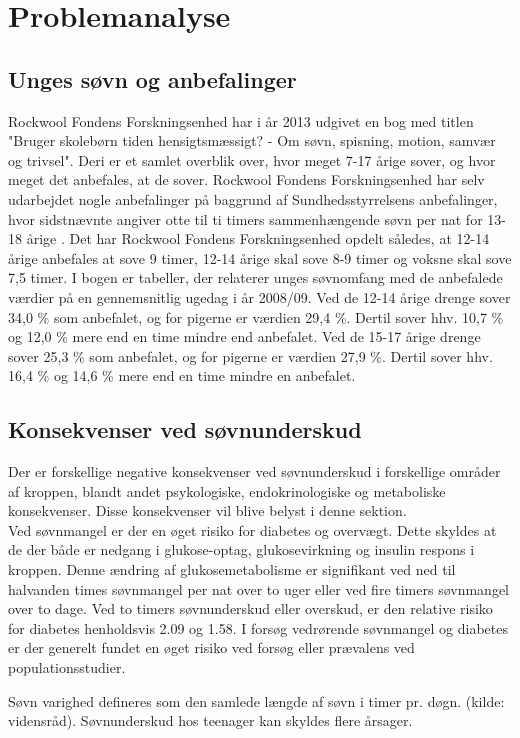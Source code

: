 \chapter{Problemanalyse}
\label{cha:Problemanalyse}


\section{Unges søvn og anbefalinger}
\label{sec:UngesSoevnOgAnbefalinger}



Rockwool Fondens Forskningsenhed har i år 2013 udgivet en bog med titlen "Bruger skolebørn tiden hensigtsmæssigt? - Om søvn, spisning, motion, samvær og trivsel". Deri er et samlet overblik over, hvor meget 7-17 årige sover, og hvor meget det anbefales, at de sover. Rockwool Fondens Forskningsenhed har selv udarbejdet nogle anbefalinger på baggrund af Sundhedsstyrrelsens anbefalinger, hvor sidstnævnte angiver otte til ti timers sammenhængende søvn per nat for 13-18 årige \cite{Sundhedsstyrrelsen2011}. Det har Rockwool Fondens Forskningsenhed opdelt således, at 12-14 årige anbefales at sove 9 timer, 12-14 årige skal sove 8-9 timer og voksne skal sove 7,5 timer. I bogen er tabeller, der relaterer unges søvnomfang med de anbefalede værdier på en gennemsnitlig ugedag i år 2008/09. Ved de 12-14 årige drenge sover 34,0 \% som anbefalet, og for pigerne er værdien 29,4 \%. Dertil sover hhv. 10,7 \% og 12,0 \% mere end en time mindre end anbefalet. Ved de 15-17 årige drenge sover 25,3 \% som anbefalet, og for pigerne er værdien 27,9 \%. Dertil sover hhv. 16,4 \% og 14,6 \% mere end en time mindre en anbefalet. \cite{Bonke2013}




\section{Konsekvenser ved søvnunderskud}
\label{sec:konsekvenser}

Der er forskellige negative konsekvenser ved søvnunderskud i forskellige områder af kroppen, blandt andet psykologiske, endokrinologiske og metaboliske konsekvenser. Disse konsekvenser vil blive belyst i denne sektion.
\\
Ved søvnmangel er der en øget risiko for diabetes og overvægt. Dette skyldes at de der både er nedgang i glukose-optag, glukosevirkning og insulin respons i kroppen. Denne ændring af glukosemetabolisme er signifikant ved ned til halvanden times søvnmangel per nat over to uger eller ved fire timers søvnmangel over to dage. \cite{https://www.ncbi.nlm.nih.gov/pmc/articles/PMC1991337/} 
Ved to timers søvnunderskud eller overskud, er den relative risiko for diabetes henholdsvis 2.09 og 1.58\cite{https://www.ncbi.nlm.nih.gov/pubmed/17717644/ (kædesøgning fra https://www.ncbi.nlm.nih.gov/pmc/articles/PMC3132857/) }. I forsøg vedrørende søvnmangel og diabetes er der generelt fundet en øget risiko ved forsøg eller prævalens ved populationsstudier\cite{https://www.ncbi.nlm.nih.gov/pmc/articles/PMC3132857/}.



Søvn varighed defineres som den samlede længde af søvn i timer pr. døgn. (kilde: vidensråd). 
Søvnunderskud hos teenager kan skyldes flere årsager. 


